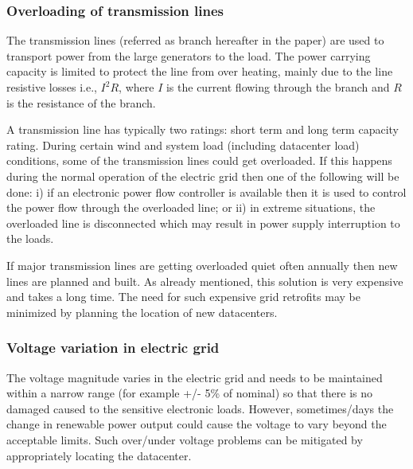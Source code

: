 \subsubsection{Overloading of transmission lines}
The transmission lines (referred as branch hereafter in the paper) are used to transport power from the large generators to the load. The power carrying capacity is limited to protect the line from over heating, mainly due to the line resistive losses i.e., $I^{2}R$, where $I$ is the current flowing through the branch and $R$ is the resistance of the branch.

A transmission line has typically two ratings: short term and long term capacity rating. During certain wind and system load (including datacenter load) conditions, some of the transmission lines could get overloaded. If this happens during the normal operation of the electric grid then one of the following will be done: i) if an electronic power flow controller is available then it is used to control the power flow through the overloaded line; or ii) in extreme situations, the overloaded line is disconnected which may result in power supply interruption to the loads.

If major transmission lines are getting overloaded quiet often annually then new lines are planned and built.  As already mentioned, this solution is very expensive and takes a long time. The need for such expensive grid retrofits may be minimized by planning the location of new datacenters.

\subsubsection{Voltage variation in electric grid}
The voltage magnitude varies in the electric grid and needs to be maintained within a narrow range (for example +/- 5\% of nominal) so that there is no damaged caused to the sensitive electronic loads. However, sometimes/days the change in renewable power output could cause the voltage to vary beyond the acceptable limits. Such over/under voltage problems can be mitigated by appropriately locating the datacenter.

